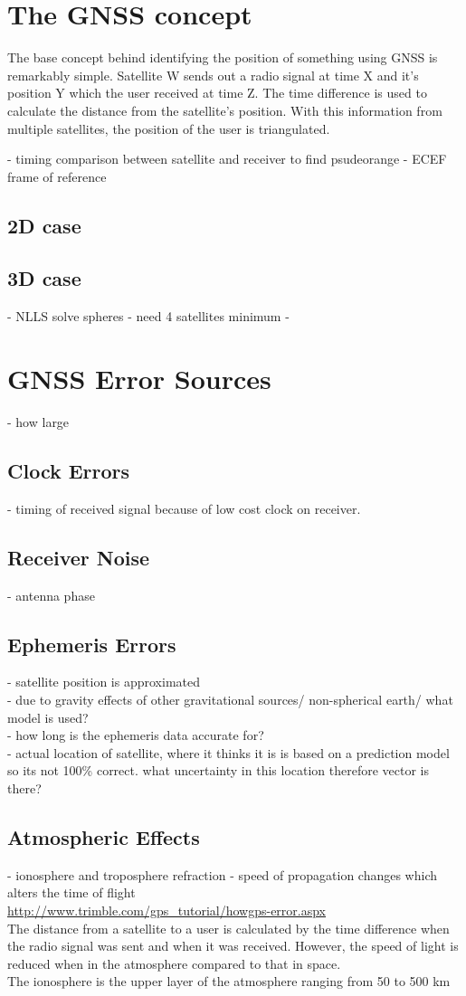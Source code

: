 \section{The GNSS concept}
The base concept behind identifying the position of something using GNSS is remarkably simple. Satellite W sends out a radio signal at time X and it's position Y which the user received at time Z. The time difference is used to calculate the distance from the satellite's position. With this information from multiple satellites, the position of the user is triangulated. 


- timing comparison between satellite and receiver to find psudeorange
- ECEF frame of reference
\subsection{2D case}
\subsection{3D case}
- NLLS solve spheres
- need 4 satellites minimum
- 


\section{GNSS Error Sources}
- how large
\subsection{Clock Errors}
- timing of received signal because of low cost clock on receiver. 
\subsection{Receiver Noise}
- antenna phase
\subsection{Ephemeris Errors}
- satellite position is approximated\\
- due to gravity effects of other gravitational sources/ non-spherical earth/ what model is used?\\
- how long is the ephemeris data accurate for?\\
- actual location of satellite, where it thinks it is is based on a prediction model so its not 100\% correct. what uncertainty in this location therefore vector is there?

\subsection{Atmospheric Effects}
- ionosphere and troposphere refraction - speed of propagation changes which alters the time of flight\\
\url{http://www.trimble.com/gps_tutorial/howgps-error.aspx} \\
The distance from a satellite to a user is calculated by the time difference when the radio signal was sent and when it was received. However, the speed of light is reduced when in the atmosphere compared to that in space.\\
The ionosphere is the upper layer of the atmosphere ranging from 50 to 500 km


